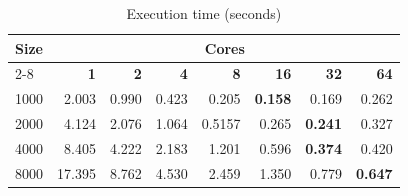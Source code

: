 \begin{table}[H]
    \centering
    \begin{tabular}{l|rrrrrrr}
        \hline
        \textbf{Size} & \multicolumn{7}{c}{\textbf{Cores}}                                                                                  \\
        \cline{2-8}
                      & \textbf{1}                         & \textbf{2} & \textbf{4} & \textbf{8} & \textbf{16} & \textbf{32} & \textbf{64} \\
        \hline
        1000          & 2.003                              & 0.990      & 0.423      & 0.205      & \textbf{0.158} & 0.169      & 0.262      \\
        2000          & 4.124                              & 2.076      & 1.064      & 0.5157     & 0.265       & \textbf{0.241} & 0.327     \\
        4000          & 8.405                              & 4.222      & 2.183      & 1.201      & 0.596       & \textbf{0.374} & 0.420     \\
        8000          & 17.395                             & 8.762      & 4.530      & 2.459      & 1.350       & 0.779      & \textbf{0.647} \\
        \hline
    \end{tabular}
    \caption{Execution time (seconds)}
\end{table}
